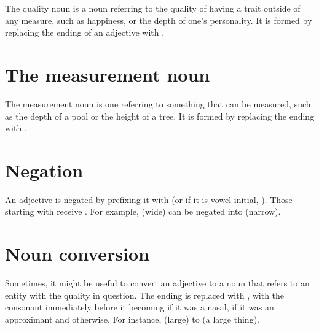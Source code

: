 \documentclass{book}
\begin{document}
The quality noun is a noun referring to the quality of having a trait outside of any measure, such as happiness, or the depth of one's personality. It is formed by replacing the ending of an adjective with .

\section{The measurement noun}

The measurement noun is one referring to something that can be measured, such as the depth of a pool or the height of a tree. It is formed by replacing the ending with .

\section{Negation}

An adjective is negated by prefixing it with  (or if it is vowel-initial, ). Those starting with  receive . For example,  (wide) can be negated into  (narrow).

\section{Noun conversion}

Sometimes, it might be useful to convert an adjective to a noun that refers to an entity with the quality in question. The ending is replaced with , with the consonant immediately before it becoming  if it was a nasal,  if it was an approximant and  otherwise. For instance,  (large) to  (a large thing).
\end{document}
